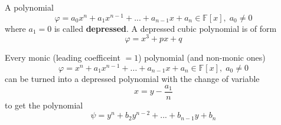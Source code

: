   \begin{definition}
    A polynomial 
    \begin{equation}
      \varphi = a_0 x^n + a_1 x^{n-1} + ... + a_{n-1} x + a_n \in \mathbb{F}[x], \; a_0 \neq 0
    \end{equation}
    where $a_1 = 0$ is called \textbf{depressed}. A depressed cubic polynomial is of form
    \begin{equation}
      \varphi = x^3 + p x + q
    \end{equation}
  \end{definition}

  \begin{theorem}
    Every monic (leading coefficeint $=1$) polynomial (and non-monic ones) 
    \begin{equation}
      \varphi = x^n + a_1 x^{n-1} + ... + a_{n-1} x + a_n \in \mathbb{F}[x], \; a_0 \neq 0
    \end{equation}
    can be turned into a depressed polynomial with the change of variable
    \begin{equation}
      x = y - \frac{a_1}{n}
    \end{equation}
    to get the polynomial 
    \begin{equation}
      \psi = y^n + b_2 y^{n-2} + ... + b_{n-1} y + b_n
    \end{equation}
  \end{theorem}

